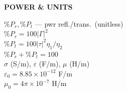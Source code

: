 \documentclass[6pt,letterpaper]{article}
\newcommand{\shead}[3]{%
  \noindent\colorbox{#1}{\parbox{\dimexpr\linewidth-2\fboxsep\relax}%
  {\color{#2}\bfseries\fontsize{6}{7}\selectfont #3}}\vspace{0.3pt}}
\begin{document}
\begin{minipage}[t]{0.19\linewidth}
\shead{graybg}{gray}{POWER \& UNITS}
\begin{ebox}
$\%P_r,\%P_t$ --- pwr refl./trans.\ (unitless)\\
$\%P_r\!=\!100|\Gamma|^2$\\
$\%P_t\!=\!100|\tau|^2\eta_1/\eta_2$\\
$\%P_r+\%P_t=100$\\
$\sigma$ (S/m), $\varepsilon$ (F/m), $\mu$ (H/m)\\
$\varepsilon_0\!=\!8.85\!\times\!10^{-12}$ F/m\\
$\mu_0\!=\!4\pi\!\times\!10^{-7}$ H/m
\end{ebox}
\end{minipage}

\newpage
\end{document}
